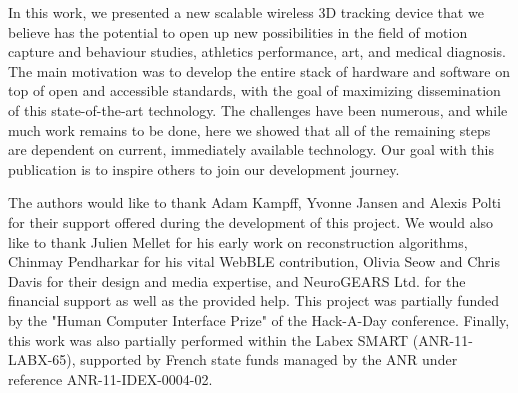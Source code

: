 \documentclass[sigchi]{acmart}
\begin{document}
In this work, we presented a new scalable wireless 3D tracking device that we believe has the potential to open up new possibilities in the field of motion capture and behaviour studies, athletics performance, art, and medical diagnosis. The main motivation was to develop the entire stack of hardware and software on top of open and accessible standards, with the goal of maximizing dissemination of this state-of-the-art technology. The challenges have been numerous, and while much work remains to be done, here we showed that all of the remaining steps are dependent on current, immediately available technology. Our goal with this publication is to inspire others to join our development journey.

\begin{acks}
The authors would like to thank Adam Kampff, Yvonne Jansen and Alexis Polti for their support offered during the development of this project. We would also like to thank Julien Mellet for his early work on reconstruction algorithms, Chinmay Pendharkar for his vital WebBLE contribution, Olivia Seow and Chris Davis for their design and media expertise, and NeuroGEARS Ltd. for the financial support as well as the provided help. This project was partially funded by the "Human Computer Interface Prize" of the Hack-A-Day conference. Finally, this work was also partially performed within the Labex SMART (ANR-11-LABX-65), supported by French state funds managed by the ANR under reference ANR-11-IDEX-0004-02.
\end{acks}




\end{document}
